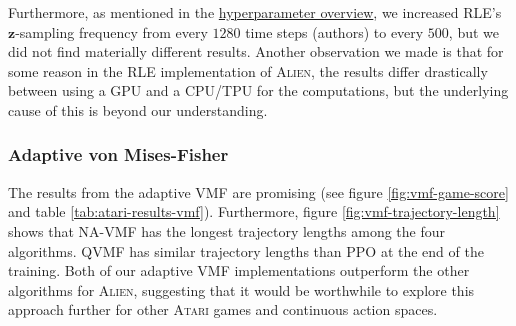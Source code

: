 \documentclass[10pt]{article} %
\begin{document}
\noindent Furthermore, as mentioned in the \hyperlink{hyperparameter-subsection}{hyperparameter overview}, we increased \textsc{RLE}'s $\textbf{z}$-sampling frequency from every $1280$ time steps (authors) to every $500$, but we did not find materially different results. Another observation we made is that for some reason in the \textsc{RLE} implementation of \textsc{Alien}, the results differ drastically between using a GPU and a CPU/TPU for the computations, but the underlying cause of this is beyond our understanding.

\subsubsection{Adaptive von Mises-Fisher}
The results from the adaptive VMF are promising (see figure \ref{fig:vmf-game-score} and table \ref{tab:atari-results-vmf}). Furthermore, figure \ref{fig:vmf-trajectory-length} shows that NA-VMF has the longest trajectory lengths among the four algorithms. QVMF has similar trajectory lengths than \textsc{PPO} at the end of the training. Both of our adaptive VMF implementations outperform the other algorithms for \textsc{Alien}, suggesting that it would be worthwhile to explore this approach further for other \textsc{Atari} games and continuous action spaces.
\end{document}
